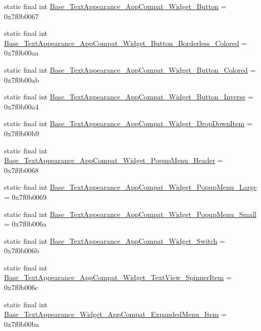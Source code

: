 \begin{CompactItemize}
\item 
static final int \hyperlink{classandroid_1_1support_1_1v4_1_1_r_1_1style_3d1fb21d72fbf6fcb2f062589b28459d}{Base\_\-TextAppearance\_\-AppCompat\_\-Widget\_\-Button} = 0x7f0b0067
\item 
static final int \hyperlink{classandroid_1_1support_1_1v4_1_1_r_1_1style_a76267851ea920e253aede11c7278bbd}{Base\_\-TextAppearance\_\-AppCompat\_\-Widget\_\-Button\_\-Borderless\_\-Colored} = 0x7f0b00aa
\item 
static final int \hyperlink{classandroid_1_1support_1_1v4_1_1_r_1_1style_72d4036c8753f35d5aee90f10b8cf0ce}{Base\_\-TextAppearance\_\-AppCompat\_\-Widget\_\-Button\_\-Colored} = 0x7f0b00ab
\item 
static final int \hyperlink{classandroid_1_1support_1_1v4_1_1_r_1_1style_d277db7a7779c04f85dff667e9e70d56}{Base\_\-TextAppearance\_\-AppCompat\_\-Widget\_\-Button\_\-Inverse} = 0x7f0b00a4
\item 
static final int \hyperlink{classandroid_1_1support_1_1v4_1_1_r_1_1style_b6b42d9a6b797e868c865e4d4feb745c}{Base\_\-TextAppearance\_\-AppCompat\_\-Widget\_\-DropDownItem} = 0x7f0b00b9
\item 
static final int \hyperlink{classandroid_1_1support_1_1v4_1_1_r_1_1style_496a96f1c165cee6a6cfe693f510ab2c}{Base\_\-TextAppearance\_\-AppCompat\_\-Widget\_\-PopupMenu\_\-Header} = 0x7f0b0068
\item 
static final int \hyperlink{classandroid_1_1support_1_1v4_1_1_r_1_1style_2f95c260af34bc4bb434066231bd25b2}{Base\_\-TextAppearance\_\-AppCompat\_\-Widget\_\-PopupMenu\_\-Large} = 0x7f0b0069
\item 
static final int \hyperlink{classandroid_1_1support_1_1v4_1_1_r_1_1style_299a3c939d0dd43795edfe645ba18b5d}{Base\_\-TextAppearance\_\-AppCompat\_\-Widget\_\-PopupMenu\_\-Small} = 0x7f0b006a
\item 
static final int \hyperlink{classandroid_1_1support_1_1v4_1_1_r_1_1style_c47c091f4d3dffcbb0bddf887a7a1149}{Base\_\-TextAppearance\_\-AppCompat\_\-Widget\_\-Switch} = 0x7f0b006b
\item 
static final int \hyperlink{classandroid_1_1support_1_1v4_1_1_r_1_1style_26315f04ea5dd44a4e85d714c357bbe1}{Base\_\-TextAppearance\_\-AppCompat\_\-Widget\_\-TextView\_\-SpinnerItem} = 0x7f0b006c
\item 
static final int \hyperlink{classandroid_1_1support_1_1v4_1_1_r_1_1style_4e5cb7456005b528e9e512cb45b0b4d5}{Base\_\-TextAppearance\_\-Widget\_\-AppCompat\_\-ExpandedMenu\_\-Item} = 0x7f0b00ba
\item 

\end{CompactItemize}
